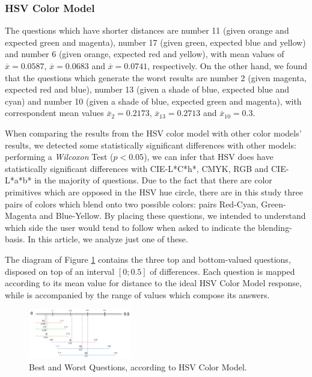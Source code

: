\subsubsection{HSV Color Model}
%
The questions which have shorter distances are number 11 (given orange and expected green and magenta),
number 17 (given green, expected blue and yellow) and number 6 (given orange, expected red and yellow),
with mean values of $\overline{x} = 0.0587$, $\overline{x} = 0.0683$ and $\overline{x} = 0.0741$,
respectively. On the other hand, we found that the questions which generate the worst results are number
2 (given magenta, expected red and blue), number 13 (given a shade of blue, expected blue and cyan) and
number 10 (given a shade of blue, expected green and magenta), with correspondent mean values
$\overline{x}_{2} = 0.2173$, $\overline{x}_{13} = 0.2713$ and $\overline{x}_{10} = 0.3$. \par
%
When comparing the results from the HSV color model with other color models' results, we detected some
statistically significant differences with other models: performing a \emph{Wilcoxon} Test ($p < 0.05$), we can
infer that HSV does have statistically significant differences with CIE-L*C*h*, CMYK, RGB and CIE-L*a*b*
in the majority of questions. Due to the fact that there are color primitives which are opposed in the
HSV hue circle, there are in this study three pairs of colors which blend onto two possible colors: pairs
Red-Cyan, Green-Magenta and Blue-Yellow. By placing these questions, we intended to understand which side
the user would tend to follow when asked to indicate the blending-basis. In this article, we analyze just
one of these. \par
%
The diagram of Figure \ref{fig:hsv_analysis} contains the three top and bottom-valued questions, disposed
on top of an interval $[0 ; 0.5]$ of differences. Each question is mapped according to its mean value for
distance to the ideal HSV Color Model response, while is accompanied by the range of values which compose
its answers.
%
\begin{figure}[!htbp]
  \centering
  \includegraphics[width=0.4\textwidth]{images/hsv_questions_analysis.png}
  \caption{Best and Worst Questions, according to HSV Color Model.}
  \label{fig:hsv_analysis}
\end{figure}
%
